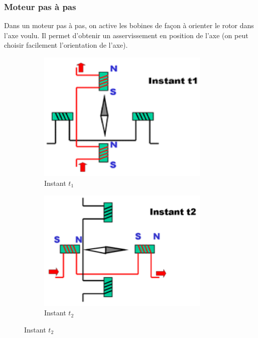 \documentclass[10pt,fleqn]{article} %
\begin{document}
\subsubsection{Moteur pas à pas}
Dans un moteur pas à pas, on active les bobines de façon à orienter le rotor dans l'axe voulu. Il permet d'obtenir un asservissement en position de l'axe (on peut choisir facilement l'orientation de l'axe).
\begin{figure}[h]
  \centering
  \begin{subfigure}{0.245\textwidth}
    \centering
    \includegraphics[width=0.9\textwidth]{images/moteur_paspas1}
    \caption{Instant $t_1$}
  \end{subfigure}
  \begin{subfigure}{.245\textwidth}
    \centering
    \includegraphics[width=0.9\textwidth]{images/moteur_paspas2}
    \caption{Instant $t_2$}
  \end{subfigure}

\end{figure}
\end{document}
